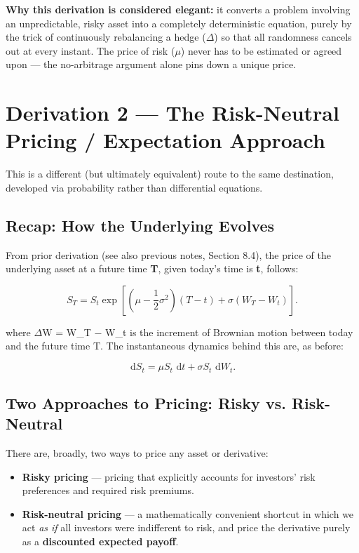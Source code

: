 \documentclass[12pt,openany]{book}
\theoremstyle{definition}
\theoremstyle{remark}
\newcommand{\dd}{\,\mathrm{d}}
\begin{document}
\textbf{Why this derivation is considered elegant:} it converts a problem involving an unpredictable, risky asset into a completely deterministic equation, purely by the trick of continuously rebalancing a hedge (\(\Delta\)) so that all randomness cancels out at every instant. The price of risk (\(\mu\)) never has to be estimated or agreed upon --- the no-arbitrage argument alone pins down a unique price.

\section{Derivation 2 --- The Risk-Neutral Pricing / Expectation Approach}

This is a different (but ultimately equivalent) route to the same destination, developed via probability rather than differential equations.

\subsection{Recap: How the Underlying Evolves}

From prior derivation (see also previous notes, Section 8.4), the price of the underlying asset at a future time \textbf{T}, given today's time is \textbf{t}, follows:

\[
S_T=S_t\exp\!\left[\left(\mu-\frac12\sigma^2\right)(T-t)+\sigma(W_T-W_t)\right].
\]

where \(\Delta\)W = W\_T \(-\) W\_t is the increment of Brownian motion between today and the future time T. The instantaneous dynamics behind this are, as before:

\[\dd S_t=\mu S_t\,\dd t+\sigma S_t\,\dd W_t.\]

\subsection{Two Approaches to Pricing: Risky vs. Risk-Neutral}

There are, broadly, two ways to price any asset or derivative:

\begin{itemize}
\item \textbf{Risky pricing} --- pricing that explicitly accounts for investors' risk preferences and required risk premiums.


\item \textbf{Risk-neutral pricing} --- a mathematically convenient shortcut in which we act \emph{as if} all investors were indifferent to risk, and price the derivative purely as a \textbf{discounted expected payoff}.


\end{itemize}
\end{document}
